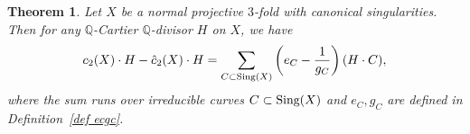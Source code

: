 \documentclass[12pt,twoside]{amsart}
\newtheorem{thm}{Theorem}[section]
\theoremstyle{definition}
\newtheorem{rem}[thm]{Remark}
\begin{document}

\begin{thm}\label{thm.diffcandgc}
 Let $X$ be a normal projective $3$-fold with canonical singularities. %
 Then for any $\mathbb{Q}$-Cartier $\mathbb{Q}$-divisor $H$ on $X$, we have
 \[
 c_2(X)\cdot H-\hat c_2(X) \cdot H=\sum_{C\subset \text{\rm Sing}(X)}\left(e_C-\frac{1}{g_C}\right)(H\cdot C),
 \]
 where the sum runs over irreducible curves $C\subset \text{\rm Sing}(X)$ and $e_C, g_C$ are defined in Definition~\ref{def ecgc}.
\end{thm}
\end{document}
